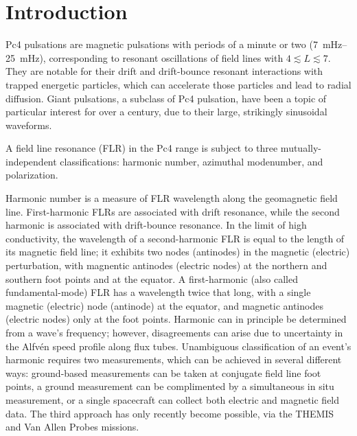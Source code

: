 \documentclass[draft,linenumbers]{agujournal}
\begin{document}

\section{Introduction}

Pc4 pulsations are magnetic pulsations with periods of a minute or two (\SIrange{7}{25}{\mHz}), corresponding to resonant oscillations of field lines with $4 \lesssim L \lesssim 7$. They are notable for their drift and drift-bounce resonant interactions with trapped energetic particles\citep{southwood_1976}, which can accelerate those particles\citep{elkington_1999} and lead to radial diffusion\citep{elkington_2003}. Giant pulsations, a subclass of Pc4 pulsation, have been a topic of particular interest for over a century, due to their large, strikingly sinusoidal waveforms\citep{brekke_1987}.

A field line resonance (FLR) in the Pc4 range is subject to three mutually-independent classifications: harmonic number, azimuthal modenumber, and polarization.

Harmonic number is a measure of FLR wavelength along the geomagnetic field line. First-harmonic FLRs are associated with drift resonance, while the second harmonic is associated with drift-bounce resonance\citep{dai_2013,poulter_1983}. In the limit of high conductivity, the wavelength of a second-harmonic FLR is equal to the length of its magnetic field line; it exhibits two nodes (antinodes) in the magnetic (electric) perturbation, with magnentic antinodes (electric nodes) at the northern and southern foot points and at the equator. A first-harmonic (also called fundamental-mode) FLR has a wavelength twice that long, with a single magnetic (electric) node (antinode) at the equator, and magnetic antinodes (electric nodes) only at the foot points. Harmonic can in principle be determined from a wave's frequency; however, disagreements can arise due to uncertainty in the Alfv\'en speed profile along flux tubes\citep{takahashi_2013}. Unambiguous classification of an event's harmonic requires two measurements, which can be achieved in several different ways: ground-based measurements can be taken at conjugate field line foot points, a ground measurement can be complimented by a simultaneous in situ measurement, or a single spacecraft can collect both electric and magnetic field data\citep{dai_2015}. The third approach has only recently become possible, via the THEMIS\citep{angelopoulos_2008} and Van Allen Probes\citep{stratton_2012} missions.
\end{document}
